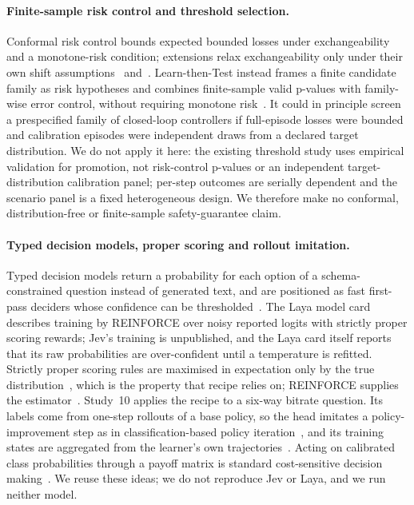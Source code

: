 \documentclass[10pt]{article}
\begin{document}
\paragraph{Finite-sample risk control and threshold selection.}
Conformal risk control bounds expected bounded losses under exchangeability and a monotone-risk condition; extensions relax exchangeability only under their own shift assumptions~\cite{angelopoulos2022conformalrisk} and~\cite{farinhas2023nonexchangeable}. Learn-then-Test instead frames a finite candidate family as risk hypotheses and combines finite-sample valid p-values with family-wise error control, without requiring monotone risk~\cite{angelopoulos2022learntest}. It could in principle screen a prespecified family of closed-loop controllers if full-episode losses were bounded and calibration episodes were independent draws from a declared target distribution. We do not apply it here: the existing threshold study uses empirical validation for promotion, not risk-control p-values or an independent target-distribution calibration panel; per-step outcomes are serially dependent and the scenario panel is a fixed heterogeneous design. We therefore make no conformal, distribution-free or finite-sample safety-guarantee claim.

\paragraph{Typed decision models, proper scoring and rollout imitation.}
Typed decision models return a probability for each option of a schema-constrained question instead of generated text, and are positioned as fast first-pass deciders whose confidence can be thresholded~\cite{laya2026modelcard}\cite{barbosa2026jev}. The Laya model card describes training by REINFORCE over noisy reported logits with strictly proper scoring rewards; Jev's training is unpublished, and the Laya card itself reports that its raw probabilities are over-confident until a temperature is refitted. Strictly proper scoring rules are maximised in expectation only by the true distribution~\cite{gneiting2007scoring}, which is the property that recipe relies on; REINFORCE supplies the estimator~\cite{williams1992reinforce}. Study~10 applies the recipe to a six-way bitrate question. Its labels come from one-step rollouts of a base policy, so the head imitates a policy-improvement step as in classification-based policy iteration~\cite{lagoudakis2003classification}, and its training states are aggregated from the learner's own trajectories~\cite{ross2011dagger}. Acting on calibrated class probabilities through a payoff matrix is standard cost-sensitive decision making~\cite{elkan2001cost}. We reuse these ideas; we do not reproduce Jev or Laya, and we run neither model.
\end{document}
